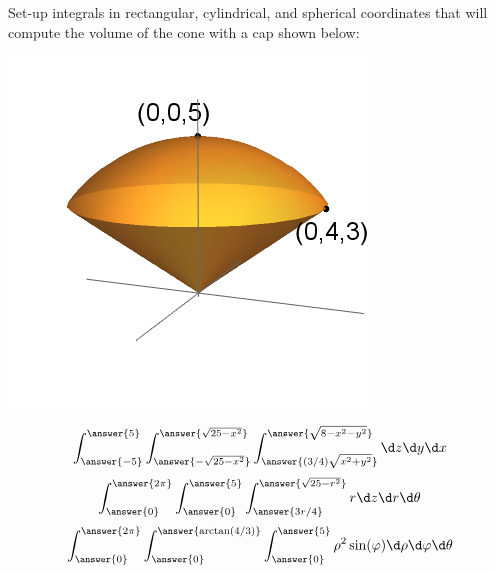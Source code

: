 \documentclass{ximera}
\author{Bart Snapp}
\begin{document}
\begin{exercise}
  Set-up integrals in rectangular, cylindrical, and spherical
  coordinates that will compute the volume of the cone with a cap shown below:
  \begin{image}
    \includegraphics{coneWithCap2.png}
  \end{image}
  \begin{prompt}
  \[
  \int_{\answer{-5}}^{\answer{5}}\int_{\answer{-\sqrt{25-x^2}}}^{\answer{\sqrt{25-x^2}}}\int_{\answer{(3/4)\sqrt{x^2+y^2}}}^{\answer{\sqrt{8-x^2-y^2}}}\d z \d y \d x
  \]
  \[
  \int_{\answer{0}}^{\answer{2\pi}}\int_{\answer{0}}^{\answer{5}}\int_{\answer{3r/4}}^{\answer{\sqrt{25-r^2}}}   r\d z \d r \d \theta
  \]
  \[
  \int_{\answer{0}}^{\answer{2\pi}}\int_{\answer{0}}^{\answer{\arctan(4/3)}}\int_{\answer{0}}^{\answer{5}}   \rho^2\sin(\varphi)\d \rho \d \varphi \d \theta
  \]
  \end{prompt}
\end{exercise}
\end{document}
